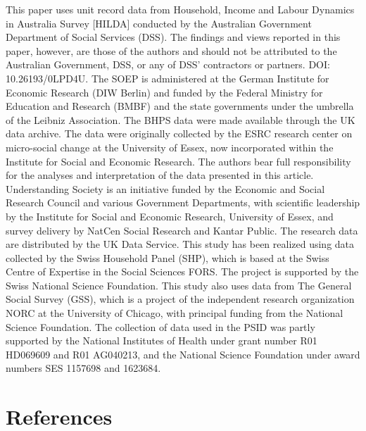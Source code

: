 \documentclass[
  11pt,
]{article}
\begin{document}
This paper uses unit record data from Household, Income and Labour
Dynamics in Australia Survey {[}HILDA{]} conducted by the Australian
Government Department of Social Services (DSS). The findings and views
reported in this paper, however, are those of the authors and should not
be attributed to the Australian Government, DSS, or any of DSS'
contractors or partners. DOI: 10.26193/0LPD4U. The SOEP is administered
at the German Institute for Economic Research (DIW Berlin) and funded by
the Federal Ministry for Education and Research (BMBF) and the state
governments under the umbrella of the Leibniz Association. The BHPS data
were made available through the UK data archive. The data were
originally collected by the ESRC research center on micro-social change
at the University of Essex, now incorporated within the Institute for
Social and Economic Research. The authors bear full responsibility for
the analyses and interpretation of the data presented in this article.
Understanding Society is an initiative funded by the Economic and Social
Research Council and various Government Departments, with scientific
leadership by the Institute for Social and Economic Research, University
of Essex, and survey delivery by NatCen Social Research and Kantar
Public. The research data are distributed by the UK Data Service. This
study has been realized using data collected by the Swiss Household
Panel (SHP), which is based at the Swiss Centre of Expertise in the
Social Sciences FORS. The project is supported by the Swiss National
Science Foundation. This study also uses data from The General Social
Survey (GSS), which is a project of the independent research
organization NORC at the University of Chicago, with principal funding
from the National Science Foundation. The collection of data used in the
PSID was partly supported by the National Institutes of Health under
grant number R01 HD069609 and R01 AG040213, and the National Science
Foundation under award numbers SES 1157698 and 1623684.

\section{References}\label{references}
\end{document}
